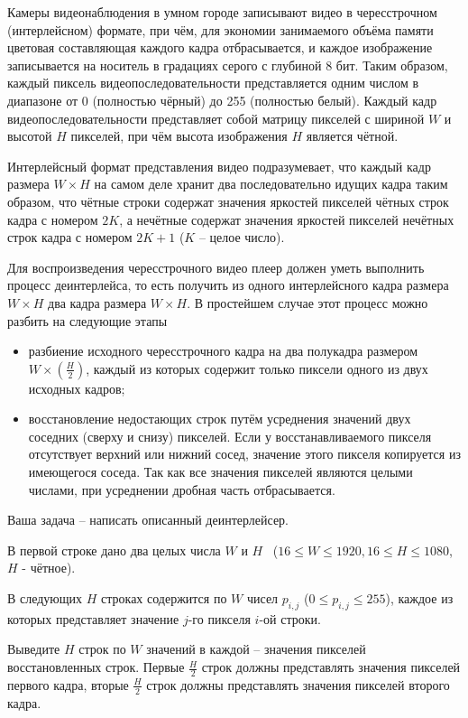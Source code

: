 
Камеры
видеонаблюдения в умном городе записывают видео в чересстрочном (интерлейсном)
формате, при чём, для экономии занимаемого объёма памяти цветовая составляющая
каждого кадра отбрасывается, и каждое изображение записывается на носитель в градациях
серого с глубиной 8 бит. Таким образом, каждый пиксель видеопоследовательности
представляется одним числом в диапазоне от 0 (полностью чёрный) до 255
(полностью белый). Каждый кадр видеопоследовательности представляет собой
матрицу пикселей с шириной $ W $ и высотой $ H $
пикселей, при чём высота изображения $ H $ является чётной.

Интерлейсный
формат представления видео подразумевает, что каждый кадр размера $ W\times H $ на самом деле хранит два
последовательно идущих кадра таким образом, что чётные строки содержат значения
яркостей пикселей чётных строк кадра с номером $ 2K $, а нечётные содержат значения яркостей
пикселей нечётных строк кадра с номером $ 2K+1 $ ($ K $ – целое число).

Для
воспроизведения чересстрочного видео плеер должен уметь выполнить процесс
деинтерлейса, то есть получить из одного интерлейсного кадра размера $  W\times H  $ 
два кадра размера $ W\times H $. В простейшем случае этот
процесс можно разбить на следующие этапы

\begin{itemize}
    \item разбиение исходного чересстрочного кадра на два
    полукадра размером \linebreak $ W\times(\frac{H}{2}) $, каждый из которых
    содержит только пиксели одного из двух исходных кадров;
    \item восстановление недостающих строк путём
    усреднения значений двух соседних (сверху и снизу) пикселей. Если у
    восстанавливаемого пикселя отсутствует верхний или нижний сосед, значение этого
    пикселя копируется из имеющегося соседа. Так как все значения пикселей являются
    целыми числами, при усреднении дробная часть отбрасывается.
\end{itemize}

Ваша задача –
написать описанный деинтерлейсер.


В первой строке
дано два целых числа $ W $ и $H$  ($16 \le W \le 1920, 16 \le H \le 1080$, $H$ -  чётное).

В следующих $ H $ строках содержится по $ W $ чисел $ p_{i,j}$ ($ 0 \le p_{i,j} \le 255 $), каждое из которых представляет значение
$j$-го пикселя $ i $-ой строки.

\outputfmtSection

Выведите $ H $ строк по $ W $ значений в каждой – значения пикселей
восстановленных  строк. Первые $ \frac{H}{2} $ строк должны представлять значения пикселей
первого кадра, вторые $ \frac{H}{2} $ строк должны представлять значения пикселей
второго кадра.

